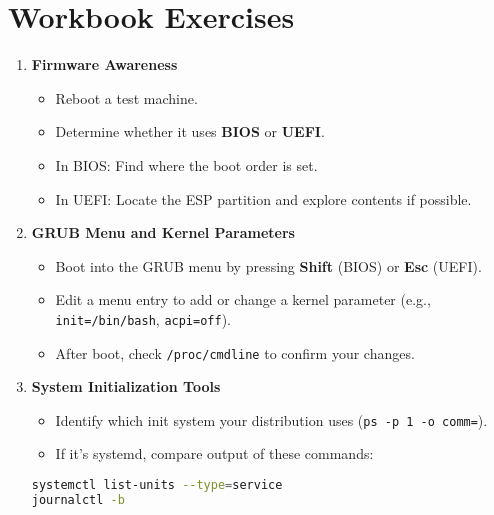 \documentclass[12pt,a4paper]{report}
\begin{document}
\section*{Workbook Exercises}

\begin{enumerate}
    \item \textbf{Firmware Awareness}
    \begin{itemize}
        \item Reboot a test machine.
        \item Determine whether it uses \textbf{BIOS} or \textbf{UEFI}.
        \item In BIOS: Find where the boot order is set.
        \item In UEFI: Locate the ESP partition and explore contents if possible.
    \end{itemize}
    \item \textbf{GRUB Menu and Kernel Parameters}
    \begin{itemize}
        \item Boot into the GRUB menu by pressing \textbf{Shift} (BIOS) or \textbf{Esc} (UEFI).
        \item Edit a menu entry to add or change a kernel parameter (e.g., \texttt{init=/bin/bash}, \texttt{acpi=off}).
        \item After boot, check \texttt{/proc/cmdline} to confirm your changes.
    \end{itemize}
    \item \textbf{System Initialization Tools}
    \begin{itemize}
        \item Identify which init system your distribution uses (\texttt{ps -p 1 -o comm=}).
        \item If it’s systemd, compare output of these commands:
\end{itemize}

\begin{lstlisting}[language=bash]
systemctl list-units --type=service
journalctl -b
\end{lstlisting}


\end{enumerate}
\end{document}
